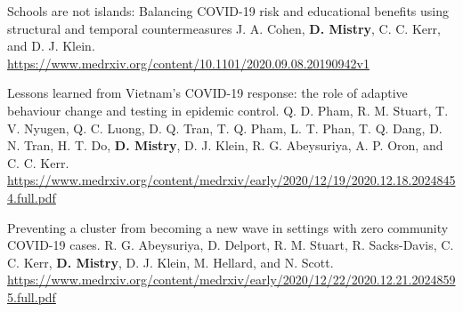 


\begin{cventries}

  \cvpublicationentrytwo
    {Schools are not islands: Balancing COVID-19 risk and educational benefits using structural and temporal countermeasures} %
    {J. A. Cohen, \textbf{D. Mistry}, C. C. Kerr, and D. J. Klein.} %
    {} %
    {} %
    {} %
    {} %
    {} %
    {\hspace{-6mm}} %
    {\href{      https://www.medrxiv.org/content/10.1101/2020.09.08.20190942v1}{https://www.medrxiv.org/content/10.1101/2020.09.08.20190942v1 \faLink\acvHeaderIconSep}} %
    \vspace{1.5mm}

  \cvpublicationentrytwo
    {Lessons learned from Vietnam's COVID-19 response: the role of adaptive behaviour change and testing in epidemic control.} %
    {Q. D. Pham, R. M. Stuart, T. V. Nyugen, Q. C. Luong, D. Q. Tran, T. Q. Pham, L. T. Phan, T. Q. Dang, D. N. Tran, H. T. Do, \textbf{D. Mistry}, D. J. Klein, R. G. Abeysuriya, A. P. Oron, and C. C. Kerr.} %
    {} %
    {} %
    {} %
    {} %
    {} %
    {\hspace{-6mm}} %
    {\href{https://www.medrxiv.org/content/medrxiv/early/2020/12/19/2020.12.18.20248454.full.pdf}{https://www.medrxiv.org/content/medrxiv/early/2020/12/19/2020.12.18.20248454.full.pdf \faLink\acvHeaderIconSep}} %
    \vspace{1.5mm}
    
  \cvpublicationentrytwo
    {Preventing a cluster from becoming a new wave in settings with zero community COVID-19 cases.} %
    {R. G. Abeysuriya, D. Delport, R. M. Stuart, R. Sacks-Davis, C. C. Kerr, \textbf{D. Mistry}, D. J. Klein, M. Hellard, and N. Scott.} %
    {} %
    {} %
    {} %
    {} %
    {} %
    {} %
    {\href{https://www.medrxiv.org/content/medrxiv/early/2020/12/22/2020.12.21.20248595.full.pdf}{https://www.medrxiv.org/content/medrxiv/early/2020/12/22/2020.12.21.20248595.full.pdf \faLink \acvHeaderIconSep}} %
    \vspace{1.5mm}


\end{cventries}
